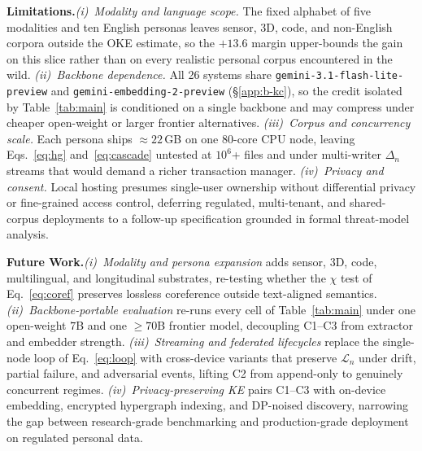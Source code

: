 \documentclass{article}
\begin{document}
\noindent\textbf{Limitations.}\quad\emph{(i)~Modality and language scope.} The fixed alphabet of five modalities and ten English personas leaves sensor, 3D, code, and non-English corpora outside the OKE estimate, so the $+13.6$ margin upper-bounds the gain on this slice rather than on every realistic personal corpus encountered in the wild. \emph{(ii)~Backbone dependence.} All 26 systems share \texttt{gemini-3.1-flash-lite-preview} and \texttt{gemini-embedding-2-preview} (\S\ref{app:b-kc}), so the credit isolated by Table~\ref{tab:main} is conditioned on a single backbone and may compress under cheaper open-weight or larger frontier alternatives. \emph{(iii)~Corpus and concurrency scale.} Each persona ships $\approx\!22$\,GB on one 80-core CPU node, leaving Eqs.~\eqref{eq:hg} and~\eqref{eq:cascade} untested at $10^{6}$+ files and under multi-writer $\Delta_n$ streams that would demand a richer transaction manager. \emph{(iv)~Privacy and consent.} Local hosting presumes single-user ownership without differential privacy or fine-grained access control, deferring regulated, multi-tenant, and shared-corpus deployments to a follow-up specification grounded in formal threat-model analysis.

\noindent\textbf{Future Work.}\quad\emph{(i)~Modality and persona expansion} adds sensor, 3D, code, multilingual, and longitudinal substrates, re-testing whether the $\chi$ test of Eq.~\eqref{eq:coref} preserves lossless coreference outside text-aligned semantics. \emph{(ii)~Backbone-portable evaluation} re-runs every cell of Table~\ref{tab:main} under one open-weight $7$B and one $\geq\!70$B frontier model, decoupling C1--C3 from extractor and embedder strength. \emph{(iii)~Streaming and federated lifecycles} replace the single-node loop of Eq.~\eqref{eq:loop} with cross-device variants that preserve $\mathcal{L}_n$ under drift, partial failure, and adversarial events, lifting C2 from append-only to genuinely concurrent regimes. \emph{(iv)~Privacy-preserving KE} pairs C1--C3 with on-device embedding, encrypted hypergraph indexing, and DP-noised discovery, narrowing the gap between research-grade benchmarking and production-grade deployment on regulated personal data.



\newpage

\end{document}
